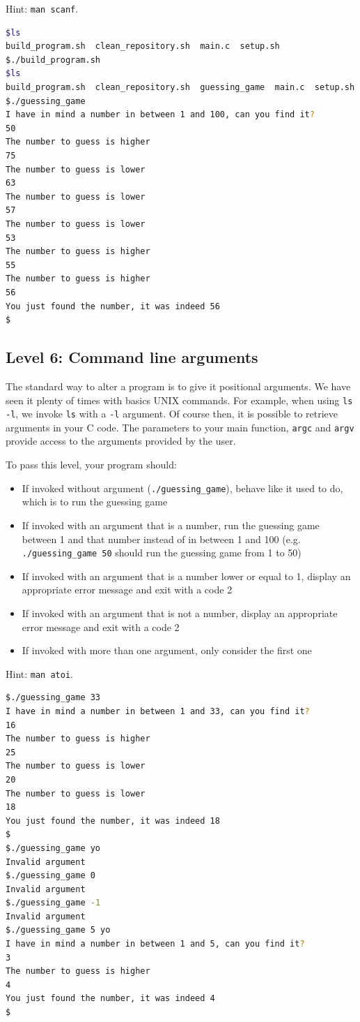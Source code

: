 \documentclass[12pt]{article}
\begin{document}
Hint: \texttt{man scanf}.

\begin{lstlisting}[language=bash]
$ls
build_program.sh  clean_repository.sh  main.c  setup.sh
$./build_program.sh
$ls
build_program.sh  clean_repository.sh  guessing_game  main.c  setup.sh
$./guessing_game
I have in mind a number in between 1 and 100, can you find it?
50
The number to guess is higher
75
The number to guess is lower
63
The number to guess is lower
57
The number to guess is lower
53
The number to guess is higher
55
The number to guess is higher
56
You just found the number, it was indeed 56
$
\end{lstlisting}

\subsection{Level 6: Command line arguments}

The standard way to alter a program is to give it positional arguments. We have seen it plenty of times with basics UNIX commands. For example, when using \texttt{ls -l}, we invoke \texttt{ls} with a \texttt{-l} argument.
Of course then, it is possible to retrieve arguments in your C code. The parameters to your main function, \texttt{argc} and \texttt{argv} provide access to the arguments provided by the user.

To pass this level, your program should:
\begin{itemize}
	\item If invoked without argument (\texttt{./guessing\_game}), behave like it used to do, which is to run the guessing game
	\item If invoked with an argument that is a number, run the guessing game between 1 and that number instead of in between 1 and 100 (e.g. \texttt{./guessing\_game 50} should run the guessing game from 1 to 50)
	\item If invoked with an argument that is a number lower or equal to 1, display an appropriate error message and exit with a code 2
	\item If invoked with an argument that is not a number, display an appropriate error message and exit with a code 2
	\item If invoked with more than one argument, only consider the first one
\end{itemize}

Hint: \texttt{man atoi}.

\begin{lstlisting}[language=bash]
$./guessing_game 33
I have in mind a number in between 1 and 33, can you find it?
16
The number to guess is higher
25
The number to guess is lower
20
The number to guess is lower
18
You just found the number, it was indeed 18
$
$./guessing_game yo
Invalid argument
$./guessing_game 0
Invalid argument
$./guessing_game -1
Invalid argument
$./guessing_game 5 yo
I have in mind a number in between 1 and 5, can you find it?
3
The number to guess is higher
4
You just found the number, it was indeed 4
$
\end{lstlisting}
\end{document}
